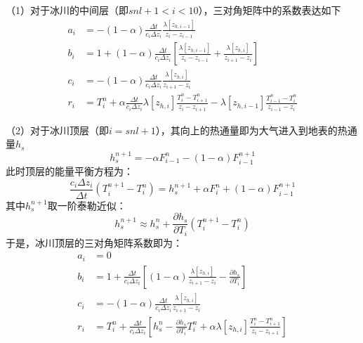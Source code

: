 （1）对于冰川的中间层（即$snl+1<i<10$），三对角矩阵中的系数表达如下
\begin{equation}
    \begin{aligned}
        a_i &= -\left(1-\alpha \right) \frac{\Delta t}{c_i \Delta z_i} \frac{\lambda \left[z_{h,i-1}\right]}{z_i-z_{i-1}} \\
        b_i &= 1+\left(1-\alpha \right) \frac{\Delta t}{c_i \Delta z_i} \left[\frac{\lambda \left[z_{h,i-1}\right]}{z_i-z_{i-1}} + \frac{\lambda \left[z_{h,i}\right]}{z_{i+1}-z_i}\right] \\
        c_i &= -\left(1-\alpha \right)\frac{\Delta t}{c_i\Delta z_i}\frac{\lambda \left[z_{h,i}\right]}{z_{i+1}-z_i} \\
        r_i &= T_{i}^{n}+\alpha \frac{\Delta t}{c_{i} \Delta z_{i}} \lambda\left[z_{h, i}\right] \frac{T_{i}^{n}-T_{i+1}^{n}}{z_{i}-z_{i+1}}-\lambda\left[z_{h, i-1}\right] \frac{T_{i-1}^{n}-T_{i}^{n}}{z_{i-1}-z_{i}}
    \end{aligned}
\end{equation}

（2）对于冰川顶层（即$i=snl+1$），其向上的热通量即为大气进入到地表的热通量$h_s$
\begin{equation}
    h^{n+1}_s=-\alpha F^n_{i-1}-\left(1-\alpha\right)F^{n+1}_{i-1}
\end{equation}
此时顶层的能量平衡方程为：
\begin{equation}
    \frac{c_i\Delta z_i}{\Delta t}\left(T^{n+1}_i-T^n_i\right) = h^{n+1}_s+\alpha F^n_i+\left(1-\alpha \right)F^{n+1}_{i-1}
\end{equation}
其中$h^{n+1}_s$取一阶泰勒近似：
\begin{equation}
    h^{n+1}_s \approx h^n_s + \frac{\partial h_s}{\partial T_i}\left(T^{n+1}_i-T^n_i\right)
\end{equation}
于是，冰川顶层的三对角矩阵系数即为：
\begin{equation}
\begin{aligned}
    a_{i} &= 0 \\ 
    b_{i} &= 1+\frac{\Delta t}{c_{i} \Delta z_{i}}\left[(1-\alpha) \frac{\lambda\left[z_{h, i}\right]}{z_{i+1}-z_{i}}-\frac{\partial h_{s}}{\partial T_{i}}\right] \\
    c_{i} &= -(1-\alpha) \frac{\Delta t}{c_{i} \Delta z_{i}} \frac{\lambda\left[z_{h, i}\right]}{z_{i+1}-z_{i}} \\
    r_{i} &= T_{i}^{n}+\frac{\Delta t}{c_{i} \Delta z_{i}}\left[h_{s}^{n}-\frac{\partial h_{s}}{\partial T_{i}} T_{i}^{n}+\alpha \lambda\left[z_{h, i}\right] \frac{T_{i}^{n}-T_{i+1}^{n}}{z_{i}-z_{i+1}}\right]
\end{aligned}
\end{equation}

